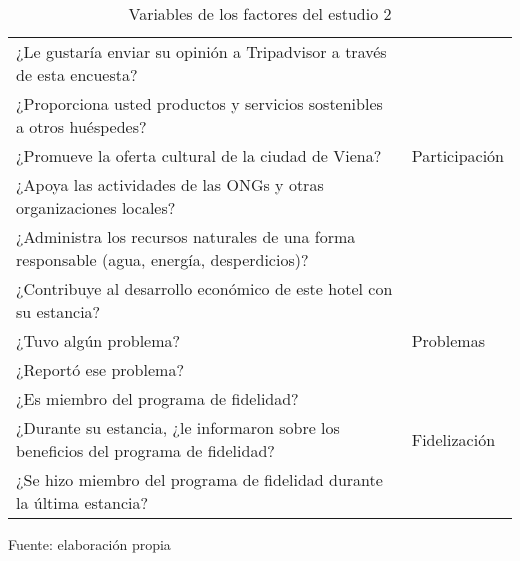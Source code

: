 \begin{table}[h]
    \caption {Variables de los factores del estudio 2}
	\label{tab:variablesFactores2}
	\setlength\extrarowheight{5pt}
	
	\begin{tabular}{p{11.8cm} p{2.9cm}}
	\toprule
	¿Le gustaría enviar su opinión a Tripadvisor a través de esta encuesta?	& \\
	¿Proporciona usted productos y servicios sostenibles a otros huéspedes?	& \\
	¿Promueve la oferta cultural de la ciudad de Viena?	& Participación \\
	¿Apoya las actividades de las ONGs y otras organizaciones locales?	& \\
	¿Administra los recursos naturales de una forma responsable (agua, energía, desperdicios)?	& \\
	¿Contribuye al desarrollo económico de este hotel con su estancia?	& \\
	\midrule
	¿Tuvo algún problema?	& Problemas \\
	¿Reportó ese problema?	& \\
	\midrule
	¿Es miembro del programa de fidelidad? & \\
	¿Durante su estancia, ¿le informaron sobre los beneficios del programa de fidelidad? & Fidelización \\
	¿Se hizo miembro del programa de fidelidad durante la última estancia? & \\
	\bottomrule
	\end{tabular}
	
	\center
	\footnotesize
	Fuente: elaboración propia
\end{table}
